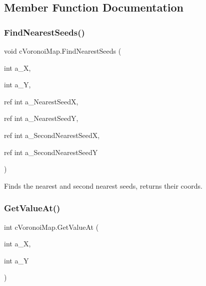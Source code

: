 \subsection{Member Function Documentation}
\mbox{\label{classc_voronoi_map_a133dc37d5d65b9568298853af3dfc0ae}} 
\subsubsection{\texorpdfstring{Find\+Nearest\+Seeds()}{FindNearestSeeds()}}
{\footnotesize\ttfamily void c\+Voronoi\+Map.\+Find\+Nearest\+Seeds (\begin{DoxyParamCaption}\item[{int}]{a\+\_\+X,  }\item[{int}]{a\+\_\+Y,  }\item[{ref int}]{a\+\_\+\+Nearest\+SeedX,  }\item[{ref int}]{a\+\_\+\+Nearest\+SeedY,  }\item[{ref int}]{a\+\_\+\+Second\+Nearest\+SeedX,  }\item[{ref int}]{a\+\_\+\+Second\+Nearest\+SeedY }\end{DoxyParamCaption})\hspace{0.3cm}{\ttfamily [inline]}}

Finds the nearest and second nearest seeds, returns their coords. \mbox{\label{classc_voronoi_map_a33e0871361414e9485ce2f6b76e8aad2}} 
\subsubsection{\texorpdfstring{Get\+Value\+At()}{GetValueAt()}\hspace{0.1cm}{\footnotesize\ttfamily [1/3]}}
{\footnotesize\ttfamily int c\+Voronoi\+Map.\+Get\+Value\+At (\begin{DoxyParamCaption}\item[{int}]{a\+\_\+X,  }\item[{int}]{a\+\_\+Y }\end{DoxyParamCaption})\hspace{0.3cm}{\ttfamily [inline]}}

